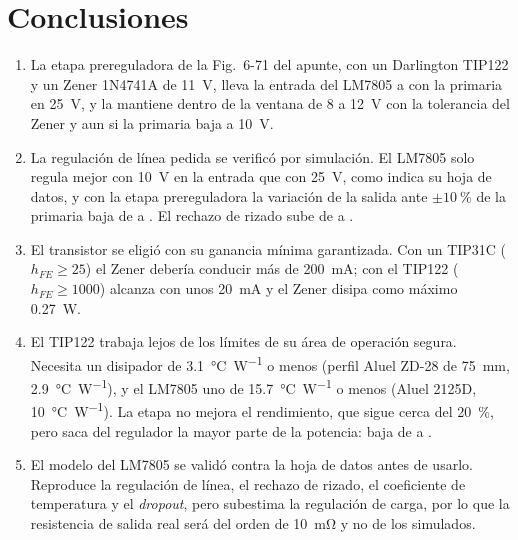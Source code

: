 \section{Conclusiones}
\begin{enumerate}
    \item La etapa prereguladora de la Fig.~6-71 del apunte, con un Darlington TIP122 y un Zener 1N4741A de \SI{11}{\volt}, lleva la entrada del LM7805 a  con la primaria en \SI{25}{\volt}, y la mantiene dentro de la ventana de \SI{8}{} a \SI{12}{\volt} con la tolerancia del Zener y aun si la primaria baja a \SI{10}{\volt}.
    \item La regulación de línea pedida se verificó por simulación. El LM7805 solo regula mejor con \SI{10}{\volt} en la entrada que con \SI{25}{\volt}, como indica su hoja de datos, y con la etapa prereguladora la variación de la salida ante $\pm\SI{10}{\percent}$ de la primaria baja de  a . El rechazo de rizado sube de  a .
    \item El transistor se eligió con su ganancia mínima garantizada. Con un TIP31C ($h_{FE} \geq 25$) el Zener debería conducir más de \SI{200}{\milli\ampere}; con el TIP122 ($h_{FE} \geq 1000$) alcanza con unos \SI{20}{\milli\ampere} y el Zener disipa como máximo \SI{0,27}{\watt}.
    \item El TIP122 trabaja lejos de los límites de su área de operación segura. Necesita un disipador de \SI{3,1}{\celsius\per\watt} o menos (perfil Aluel ZD-28 de \SI{75}{\milli\meter}, \SI{2,9}{\celsius\per\watt}), y el LM7805 uno de \SI{15,7}{\celsius\per\watt} o menos (Aluel 2125D, \SI{10}{\celsius\per\watt}). La etapa no mejora el rendimiento, que sigue cerca del \SI{20}{\percent}, pero saca del regulador la mayor parte de la potencia: baja de  a .
    \item El modelo del LM7805 se validó contra la hoja de datos antes de usarlo. Reproduce la regulación de línea, el rechazo de rizado, el coeficiente de temperatura y el \emph{dropout}, pero subestima la regulación de carga, por lo que la resistencia de salida real será del orden de \SI{10}{\milli\ohm} y no de los  simulados.
\end{enumerate}

